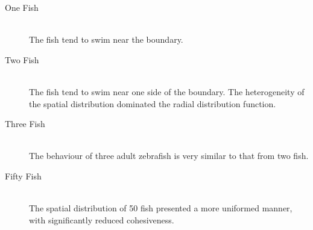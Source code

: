 \documentclass[11pt,twoside]{report}
\begin{document}
\begin{adjustwidth}{0cm}{-5cm}
\begin{tcolorbox}[
fonttitle=\sffamily\Large,
right=0.1\linewidth,
top=5mm,
bottom=5mm,
title=Summary of Chapter~3,
]
\begin{itemize}
\begin{description}
		\item[One Fish] \hfill \\
		The fish tend to swim near the boundary.
		\item[Two Fish] \hfill \\
		The fish tend to swim near one side of the boundary. The heterogeneity of the spatial distribution dominated the radial distribution function.
		\item[Three Fish] \hfill \\
		The behaviour of three adult zebrafish is very similar to that from two fish.
		\item[Fifty Fish] \hfill \\
		The spatial distribution of 50 fish presented a more uniformed manner, with significantly reduced cohesiveness.
	\end{description}
\end{itemize}
\end{tcolorbox}

\end{adjustwidth}
\end{document}
